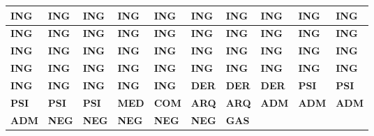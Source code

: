 \begin{table}[H]
\begin{minipage}{0.45\textwidth}
    \begin{tabular}{|>{\scriptsize}m{0.6cm}|>{\scriptsize}m{0.6cm}|>{\scriptsize}m{0.6cm}|>{\scriptsize}m{0.6cm}|>{\scriptsize}m{0.6cm}|>{\scriptsize}m{0.6cm}|>{\scriptsize}m{0.6cm}|>{\scriptsize}m{0.6cm}|>{\scriptsize}m{0.6cm}|>{\scriptsize}m{0.6cm}|} \hline \scriptsize{\textbf{ING}} & \scriptsize{\textbf{ING}} & \scriptsize{\textbf{ING}} & \scriptsize{\textbf{ING}} & \scriptsize{\textbf{ING}} & \scriptsize{\textbf{ING}} & \scriptsize{\textbf{ING}} & \scriptsize{\textbf{ING}} & \scriptsize{\textbf{ING}} & \scriptsize{\textbf{ING}} \\ \hline \scriptsize{\textbf{ING}} & \scriptsize{\textbf{ING}} & \scriptsize{\textbf{ING}} & \scriptsize{\textbf{ING}} & \scriptsize{\textbf{ING}} & \scriptsize{\textbf{ING}} & \scriptsize{\textbf{ING}} & \scriptsize{\textbf{ING}} & \scriptsize{\textbf{ING}} & \scriptsize{\textbf{ING}} \\ \hline \scriptsize{\textbf{ING}} & \scriptsize{\textbf{ING}} & \scriptsize{\textbf{ING}} & \scriptsize{\textbf{ING}} & \scriptsize{\textbf{ING}} & \scriptsize{\textbf{ING}} & \scriptsize{\textbf{ING}} & \scriptsize{\textbf{ING}} & \scriptsize{\textbf{ING}} & \scriptsize{\textbf{ING}} \\ \hline \scriptsize{\textbf{ING}} & \scriptsize{\textbf{ING}} & \scriptsize{\textbf{ING}} & \scriptsize{\textbf{ING}} & \scriptsize{\textbf{ING}} & \scriptsize{\textbf{ING}} & \scriptsize{\textbf{ING}} & \scriptsize{\textbf{ING}} & \scriptsize{\textbf{ING}} & \scriptsize{\textbf{ING}} \\ \hline \scriptsize{\textbf{ING}} & \scriptsize{\textbf{ING}} & \scriptsize{\textbf{ING}} & \scriptsize{\textbf{ING}} & \scriptsize{\textbf{ING}} & \scriptsize{\textbf{DER}} & \scriptsize{\textbf{DER}} & \scriptsize{\textbf{DER}} & \scriptsize{\textbf{PSI}} & \scriptsize{\textbf{PSI}} \\ \hline \scriptsize{\textbf{PSI}} & \scriptsize{\textbf{PSI}} & \scriptsize{\textbf{PSI}} & \scriptsize{\textbf{MED}} & \scriptsize{\textbf{COM}} & \scriptsize{\textbf{ARQ}} & \scriptsize{\textbf{ARQ}} & \scriptsize{\textbf{ADM}} & \scriptsize{\textbf{ADM}} & \scriptsize{\textbf{ADM}} \\ \hline \scriptsize{\textbf{ADM}} & \scriptsize{\textbf{NEG}} & \scriptsize{\textbf{NEG}} & \scriptsize{\textbf{NEG}} & \scriptsize{\textbf{NEG}} & \scriptsize{\textbf{NEG}} & \scriptsize{\textbf{GAS}} & & & \\ \hline \end{tabular}
  \end{minipage}
\end{table}


